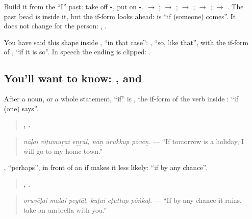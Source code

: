 Build it from the \textquotedblleft{}I\textquotedblright{} past: take off \textbf{-}, put on \textbf{-}. \textbf{} $\to$ \textbf{}; \textbf{} $\to$ \textbf{}; \textbf{} $\to$ \textbf{}; \textbf{} $\to$ \textbf{}; \textbf{} $\to$ \textbf{}. The past bead is inside it, but the if-form looks ahead: \textbf{} is \textquotedblleft{}if (someone) comes\textquotedblright{}. It does not change for the person: \textbf{ }, \textbf{ }.

You have said this shape inside \textbf{}, \textquotedblleft{}in that case\textquotedblright{}: \textbf{}, \textquotedblleft{}so, like that\textquotedblright{}, with the if-form of \textbf{}, \textquotedblleft{}if it is so\textquotedblright{}. In speech the ending is clipped: \textbf{}.

\subsection*{You'll want to know: , and }
After a noun, or a whole statement, \textquotedblleft{}if\textquotedblright{} is \textbf{}, the if-form of the verb inside \textbf{}: \textquotedblleft{}if (one) says\textquotedblright{}.

\begin{quote}
\textbf{  ,   .}
\end{quote}

\begin{quote}
\emph{nāḷai viṭumuṟai eṉṟāl, nāṉ ūrukkup pōvēṉ.} — \textquotedblleft{}If tomorrow is a holiday, I will go to my home town.\textquotedblright{}
\end{quote}

\textbf{}, \textquotedblleft{}perhaps\textquotedblright{}, in front of an if makes it less likely: \textquotedblleft{}if by any chance\textquotedblright{}.

\begin{quote}
\textbf{  ,   .}
\end{quote}

\begin{quote}
\emph{oruvēḷai maḻai peytāl, kuṭai eṭuttup pōṅkaḷ.} — \textquotedblleft{}If by any chance it rains, take an umbrella with you.\textquotedblright{}
\end{quote}

